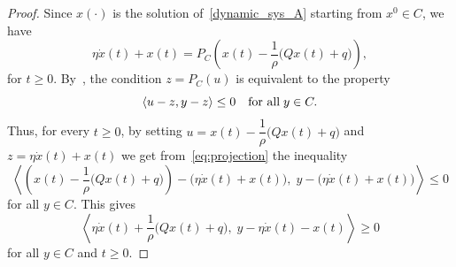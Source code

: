 \documentclass[11pt]{article}
\theoremstyle{definition}
\theoremstyle{remark}
\begin{document}
\begin{proof} Since $x(\cdot)$ is the solution of~\eqref{dynamic_sys_A} starting from  $x^0\in C$, we have
	\begin{equation}\label{eq:projection}
	\eta	\dot{x}(t) +x(t)=  P_C\left(x(t)-\dfrac{1}{\rho}\big(Q x(t)+q\big)\right),
	\end{equation}
	for $t\geq 0$. By~\cite[Theorem~2.3, p.~9]{ks80}, the condition $z= P_C(u)$ is equivalent to the property 
	\begin{equation*}
		\langle u-z, y- z\rangle  \leq 0\quad \mbox{\rm for all}\; y\in C.
	\end{equation*}	
Thus, for every $t\geq 0$, by setting $u= x(t)-\dfrac{1}{\rho}\big(Q x(t)+q\big)$ and $z= \eta	\dot{x}(t) +x(t)$ we get from~\eqref{eq:projection} the inequality
	\begin{equation*}\label{dynamic_sys_A1}
		\left\langle\left(x(t)-\dfrac{1}{\rho}\big(Q x(t)+ q\big)\right)- \Big(\eta \dot{x}(t) + x(t)\Big),\; y-\Big(\eta \dot{x}(t) + x(t)\Big) \right\rangle \leq 0
	\end{equation*}
	for all $y\in C$. This gives	
	\begin{equation}\label{dynamic_sys_A2}
		\left\langle \eta \dot{x}(t) + \dfrac{1}{\rho}\big(Q x(t)+ q\big),\; y-\eta\dot{x}(t) -x (t)  \right\rangle \geq 0
	\end{equation}for all $y\in C$ and $t\geq 0$.


\end{proof}
\end{document}
